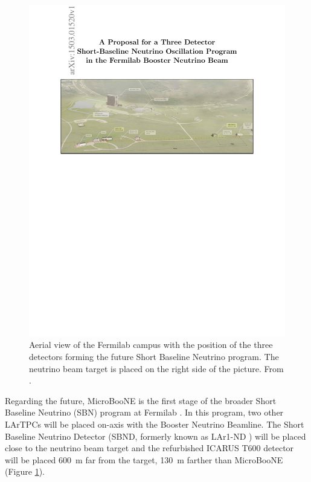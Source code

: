 \begin{figure}[htbp]
    \centering
    \includegraphics[width=0.98\linewidth]{figures/sbn_aerial.pdf}
    \caption{Aerial view of the Fermilab campus with the position of the three detectors forming the future Short Baseline Neutrino program. The neutrino beam target is placed on the right side of the picture. From \cite{Antonello:2015lea}.}
    \label{fig:sbn_aerial}
\end{figure}

Regarding the future, MicroBooNE is the first stage of the broader Short Baseline Neutrino (SBN) program at Fermilab \cite{Antonello:2015lea}. In this program, two other LArTPCs will be placed on-axis with the Booster Neutrino Beamline. The Short Baseline Neutrino Detector (SBND, formerly known as LAr1-ND \cite{Adams:2013uaa}) will be placed close to the neutrino beam target and the refurbished ICARUS T600 detector \cite{Varanini:2017pvw} will be placed 600~m far from the target, 130~m farther than MicroBooNE (Figure \ref{fig:sbn_aerial}).


